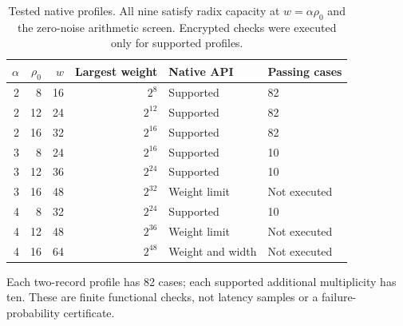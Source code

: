 \begin{table}[tbp]
\centering\small
\caption{Tested native profiles. All nine satisfy radix capacity at $w=\alpha\rho_0$ and the zero-noise arithmetic screen. Encrypted checks were executed only for supported profiles.}
\label{tab:native-frontier}
\setlength{\tabcolsep}{4pt}
\begin{tabular}{@{}rrrrll@{}}
\toprule
$\alpha$ & $\rho_0$ & $w$ & Largest weight & Native API & Passing cases \\
\midrule
2 & 8 & 16 & $2^{8}$ & Supported & 82 \\
2 & 12 & 24 & $2^{12}$ & Supported & 82 \\
2 & 16 & 32 & $2^{16}$ & Supported & 82 \\
3 & 8 & 24 & $2^{16}$ & Supported & 10 \\
3 & 12 & 36 & $2^{24}$ & Supported & 10 \\
3 & 16 & 48 & $2^{32}$ & Weight limit & Not executed \\
4 & 8 & 32 & $2^{24}$ & Supported & 10 \\
4 & 12 & 48 & $2^{36}$ & Weight limit & Not executed \\
4 & 16 & 64 & $2^{48}$ & Weight and width & Not executed \\
\bottomrule\end{tabular}
\par\smallskip\begin{minipage}{\linewidth}\footnotesize Each two-record profile has 82 cases; each supported additional multiplicity has ten. These are finite functional checks, not latency samples or a failure-probability certificate.\end{minipage}
\end{table}
